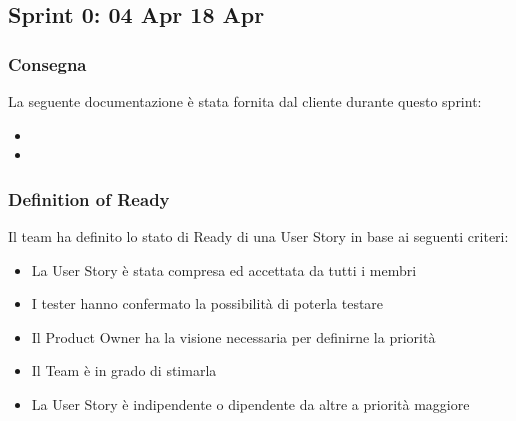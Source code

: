 \documentclass[letterpaper,10pt,italian]{sphinxmanual}
\begin{document}
\subsection{Sprint 0: 04 Apr \sphinxhyphen{} 18 Apr}
\label{\detokenize{development/sprint0/index:sprint-0-04-apr-18-apr}}\label{\detokenize{development/sprint0/index::doc}}

\subsubsection{Consegna}
\label{\detokenize{development/sprint0/index:consegna}}
\sphinxAtStartPar
La seguente documentazione è stata fornita dal cliente durante questo sprint:
\begin{itemize}
\item {} 
\sphinxAtStartPar
{}

\item {} 
\sphinxAtStartPar
{}

\end{itemize}


\subsubsection{Definition of Ready}
\label{\detokenize{development/sprint0/index:definition-of-ready}}
\sphinxAtStartPar
Il team ha definito lo stato di Ready di una User Story in base ai seguenti criteri:
\begin{itemize}
\item {} 
\sphinxAtStartPar
La User Story è stata compresa ed accettata da tutti i membri

\item {} 
\sphinxAtStartPar
I tester hanno confermato la possibilità di poterla testare

\item {} 
\sphinxAtStartPar
Il Product Owner ha la visione necessaria per definirne la priorità

\item {} 
\sphinxAtStartPar
Il Team è in grado di stimarla

\item {} 
\sphinxAtStartPar
La User Story è indipendente o dipendente da altre a priorità maggiore

\end{itemize}
\end{document}
